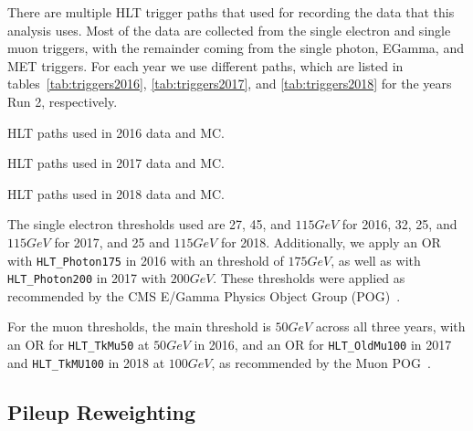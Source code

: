 There are multiple HLT trigger paths that used for recording the data that this analysis uses.
Most of the data are collected from the single electron and single muon triggers, with the remainder coming from the single photon, EGamma, and MET triggers.
For each year we use different paths, which are listed in tables~\ref{tab:triggers2016}, \ref{tab:triggers2017}, and \ref{tab:triggers2018} for the years Run 2, respectively.

\begin{table}[htbp]
  \centering
  
  \caption{
    HLT paths used in 2016 data and MC.
  }
  \label{tab:triggers2016}
\end{table}

\begin{table}[htbp]
  \centering
  
  \caption{
    HLT paths used in 2017 data and MC.
  }
  \label{tab:triggers2017}
\end{table}

\begin{table}[htbp]
  \centering
  
  \caption{
    HLT paths used in 2018 data and MC.
  }
  \label{tab:triggers2018}
\end{table}

The single electron \pt thresholds used are 27, 45, and $115\unit{GeV}$ for 2016, 32, 25, and $115\unit{GeV}$ for 2017, and 25 and $115\unit{GeV}$ for 2018. %
Additionally, we apply an OR with \texttt{HLT\_Photon175} in 2016 with an \Et threshold of $175\unit{GeV}$, as well as with \texttt{HLT\_Photon200} in 2017 with $200\unit{GeV}$. %
These thresholds were applied as recommended by the CMS E/Gamma Physics Object Group (POG)~\cite{MuonPOG}.

For the muon thresholds, the main threshold is $50\unit{GeV}$ across all three years, with an OR for \texttt{HLT\_TkMu50} at $50\unit{GeV}$ in 2016, and an OR for \texttt{HLT\_OldMu100} in 2017 and \texttt{HLT\_TkMU100} in 2018 at $100\unit{GeV}$, as recommended by the Muon POG~\cite{MuonHLT2016,MuonHLT2017,MuonHLT2018}.


\subsection{Pileup Reweighting}


